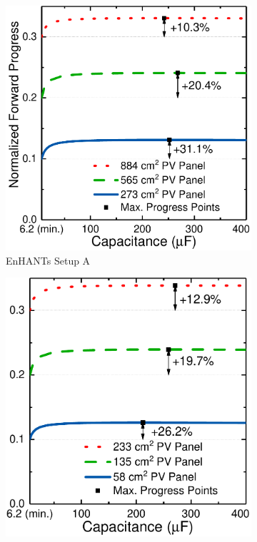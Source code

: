 \begin{figure}
    \centering
    \begin{subfigure}{0.51\columnwidth}
        \centering
        \includegraphics[width=\columnwidth]{ch4_sizingapproach/figures/HarvStorTgFig1}
        \caption{EnHANTs Setup A}
        \label{fig:harvstor1}
    \end{subfigure}
    \begin{subfigure}{0.483\columnwidth}
        \centering
        \includegraphics[width=\columnwidth]{ch4_sizingapproach/figures/HarvStorTgFig2}

\end{subfigure}
\end{figure}
